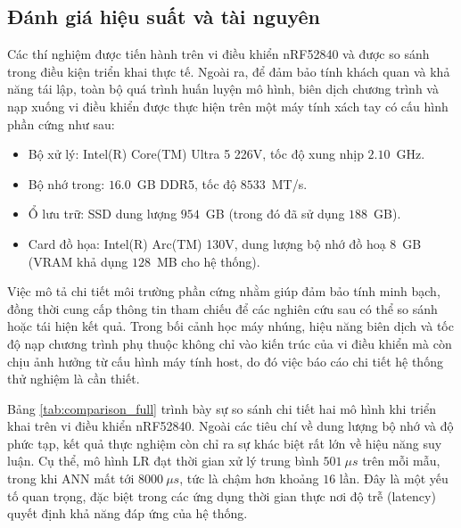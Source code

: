 \subsection*{Đánh giá hiệu suất và tài nguyên}

Các thí nghiệm được tiến hành trên vi điều khiển nRF52840 và được so sánh trong
điều kiện triển khai thực tế. Ngoài ra, để đảm bảo tính khách quan và khả năng
tái lập, toàn bộ quá trình huấn luyện mô hình, biên dịch chương trình và nạp
xuống vi điều khiển được thực hiện trên một máy tính xách tay có cấu hình phần
cứng như sau:

\begin{itemize}
    \item Bộ xử lý: Intel(R) Core(TM) Ultra 5 226V, tốc độ xung nhịp $2.10$~GHz.
    \item Bộ nhớ trong: $16.0$~GB DDR5, tốc độ $8533$~MT/s.
    \item Ổ lưu trữ: SSD dung lượng $954$~GB (trong đó đã sử dụng $188$~GB).
    \item Card đồ họa: Intel(R) Arc(TM) 130V, dung lượng bộ nhớ đồ hoạ $8$~GB (VRAM khả
          dụng $128$~MB cho hệ thống).
\end{itemize}

Việc mô tả chi tiết môi trường phần cứng nhằm giúp đảm bảo tính minh bạch, đồng
thời cung cấp thông tin tham chiếu để các nghiên cứu sau có thể so sánh hoặc
tái hiện kết quả. Trong bối cảnh học máy nhúng, hiệu năng biên dịch và tốc độ
nạp chương trình phụ thuộc không chỉ vào kiến trúc của vi điều khiển mà còn
chịu ảnh hưởng từ cấu hình máy tính host, do đó việc báo cáo chi tiết hệ thống
thử nghiệm là cần thiết.

Bảng \ref{tab:comparison_full} trình bày sự so sánh chi tiết hai mô hình khi
triển khai trên vi điều khiển nRF52840. Ngoài các tiêu chí về dung lượng bộ nhớ
và độ phức tạp, kết quả thực nghiệm còn chỉ ra sự khác biệt rất lớn về hiệu
năng suy luận. Cụ thể, mô hình LR đạt thời gian xử lý trung bình $501~\mu s$
trên mỗi mẫu, trong khi ANN mất tới $8000~\mu s$, tức là chậm hơn khoảng $16$
lần. Đây là một yếu tố quan trọng, đặc biệt trong các ứng dụng thời gian thực
nơi độ trễ (latency) quyết định khả năng đáp ứng của hệ thống.

